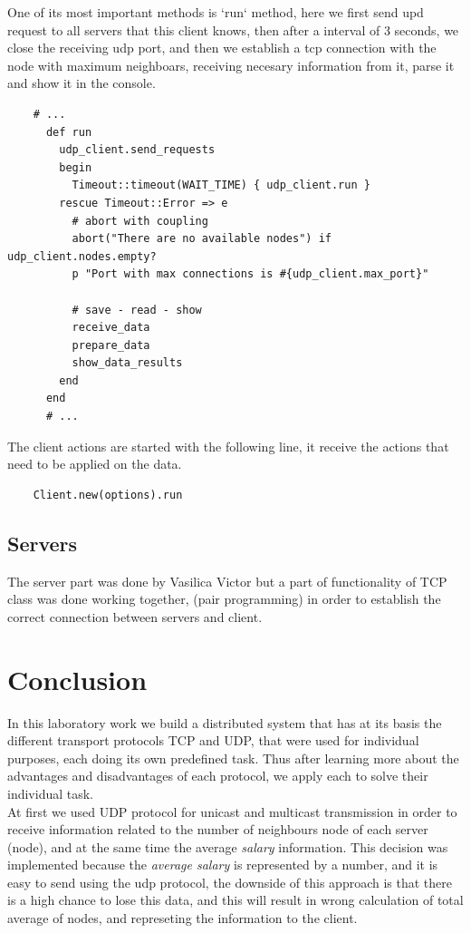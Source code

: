 \documentclass[12pt]{article}
\begin{document}
    One of its most important methods is `run` method, here we first send
    upd request to all servers that this client knows, then after a interval of 3 seconds,
    we close the receiving udp port, and then we establish a tcp connection with the node
    with maximum neighboars, receiving necesary information from it, parse it and show it
    in the console.

    \begin{lstlisting}
    # ...
      def run
        udp_client.send_requests
        begin
          Timeout::timeout(WAIT_TIME) { udp_client.run }
        rescue Timeout::Error => e
          # abort with coupling
          abort("There are no available nodes") if udp_client.nodes.empty?
          p "Port with max connections is #{udp_client.max_port}"

          # save - read - show
          receive_data
          prepare_data
          show_data_results
        end
      end
      # ...
    \end{lstlisting}

    The client actions are started with the following line, it receive
    the actions that need to be applied on the data.

    \begin{lstlisting}
    Client.new(options).run
    \end{lstlisting}

    \subsection{Servers}

    The server part was done by Vasilica Victor but a part of functionality of TCP class was done working together, (pair programming)
    in order to establish the correct connection between servers and client.

    \section{Conclusion}

    In this laboratory work we build a distributed system that has at its basis the different transport protocols TCP and UDP,
    that were used for individual purposes, each doing its own predefined task. Thus after learning more about the advantages
    and disadvantages of each protocol, we apply each to solve their individual task. \\

    At first we used UDP protocol for unicast and multicast transmission in order to receive information related to the number
    of neighbours node of each server (node), and at the same time the average \textit{salary} information. This decision was
    implemented because the \textit{average salary} is represented by a number, and it is easy to send using the udp protocol,
    the downside of this approach is that there is a high chance to lose this data, and this will result in wrong calculation of total
    average of nodes, and represeting the information to the client. \\
\end{document}
